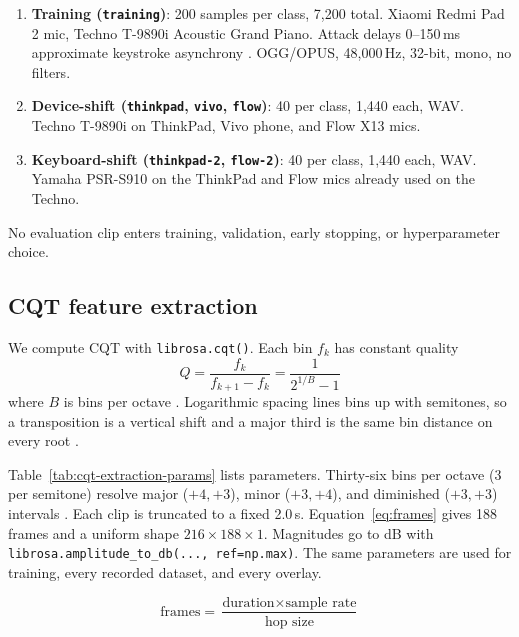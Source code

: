 \documentclass[pdflatex,sn-mathphys-num,iicol]{sn-jnl}
\theoremstyle{thmstyleone}
\theoremstyle{thmstyletwo}
\theoremstyle{thmstylethree}
\begin{document}
\begin{enumerate}[1.]
\item \textbf{Training (\texttt{training})}: 200 samples per class, 7{,}200 total. Xiaomi Redmi Pad 2 mic, Techno T-9890i Acoustic Grand Piano. Attack delays 0--150\,ms approximate keystroke asynchrony \cite{Bella2011}. OGG/OPUS, 48{,}000\,Hz, 32-bit, mono, no filters.
\item \textbf{Device-shift (\texttt{thinkpad}, \texttt{vivo}, \texttt{flow})}: 40 per class, 1{,}440 each, WAV. Techno T-9890i on ThinkPad, Vivo phone, and Flow X13 mics.
\item \textbf{Keyboard-shift (\texttt{thinkpad-2}, \texttt{flow-2})}: 40 per class, 1{,}440 each, WAV. Yamaha PSR-S910 on the ThinkPad and Flow mics already used on the Techno.
\end{enumerate}

No evaluation clip enters training, validation, early stopping, or hyperparameter choice.

\subsection{CQT feature extraction}\label{subsec3_2}

We compute CQT with \texttt{librosa.cqt()}. Each bin $f_k$ has constant quality
\begin{equation}
Q = \frac{f_k}{f_{k+1} - f_k} = \frac{1}{2^{1/B} - 1}
\label{eq:cqt}
\end{equation}
where $B$ is bins per octave \cite{Li2021}\cite{Lacoste2007}. Logarithmic spacing lines bins up with semitones, so a transposition is a vertical shift and a major third is the same bin distance on every root \cite{Harte2010}.

Table~\ref{tab:cqt-extraction-params} lists parameters. Thirty-six bins per octave (3 per semitone) resolve major ($+4,+3$), minor ($+3,+4$), and diminished ($+3,+3$) intervals \cite{Akram2025}\cite{OHanlon2021}. Each clip is truncated to a fixed 2.0\,s. Equation~\ref{eq:frames} gives 188 frames and a uniform shape $216 \times 188 \times 1$. Magnitudes go to dB with \texttt{librosa.amplitude\_to\_db(..., ref=np.max)}. The same parameters are used for training, every recorded dataset, and every overlay.

\begin{equation}
\text{frames} = \frac{\text{duration} \times \text{sample rate}}{\text{hop size}}
\label{eq:frames}
\end{equation}
\end{document}
